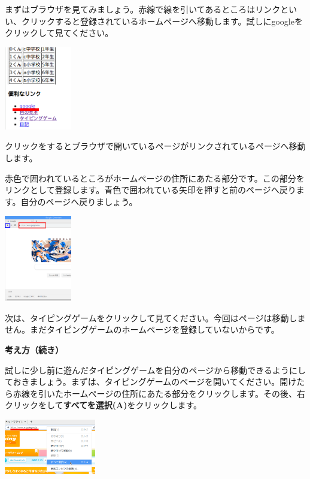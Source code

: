 \documentclass[a4paper,12pt]{jarticle}
\begin{document}
まずはブラウザを見てみましょう。赤線で線を引いてあるところはリンクといい、クリックすると登録されているホームページへ移動します。試しにgoogleをクリックして見てください。


\bigskip

\centering
\includegraphics[width=0.22\textwidth]{textbook-img194.png}


\flushleft

\bigskip

クリックをするとブラウザで開いているページがリンクされているページへ移動します。

赤色で囲われているところがホームページの住所にあたる部分です。この部分をリンクとして登録します。青色で囲われている矢印を押すと前のページへ戻ります。自分のページへ戻りましょう。



\bigskip

\centering
\includegraphics[width=0.22\textwidth]{textbook-img195.png}

\bigskip

\flushleft
次は、タイピングゲームをクリックして見てください。今回はページは移動しません。まだタイピングゲームのホームページを登録していないからです。


\clearpage
\textbf{考え方（続き）}



試しに少し前に遊んだタイピングゲームを自分のページから移動できるようにしておきましょう。まずは、タイピングゲームのページを開いてください。開けたら赤線を引いたホームページの住所にあたる部分をクリックします。その後、右クリックをして\textbf{すべてを選択(A)}をクリックします。


\bigskip

\centering
\includegraphics[width=0.3\textwidth]{textbook-img196.png}
\end{document}
